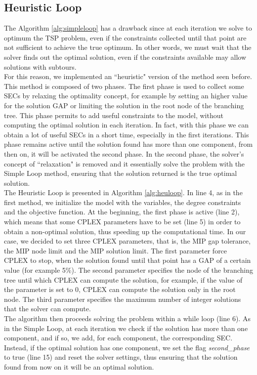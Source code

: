 \subsection{Heuristic Loop}
The Algorithm \ref{alg:simpleloop} has a drawback since at each iteration we solve to optimum the TSP problem, even if the constraints collected until that point are not sufficient to achieve the true optimum. In other words, we must wait that the solver finds out the optimal solution, even if the constraints available may allow solutions with subtours.
\\ For this reason, we implemented an ``heuristic" version of the method seen before. This method is composed of two phases. The first phase is used to collect some SECs by relaxing the optimality concept, for example by setting an higher value for the solution GAP or limiting the solution in the root node of the branching tree.
This phase permits to add useful constraints to the model, without computing the optimal solution in each iteration. In fact, with this phase we can obtain a lot of useful SECs in a short time, especially in the first iterations.
This phase remains active until the solution found has more than one component, from then on, it will be activated the second phase. 
In the second phase, the solver's concept of ``relaxation" is removed and it essentially solve the problem with the Simple Loop method, ensuring that the solution returned is the true optimal solution.
\\ The Heuristic Loop is presented in Algorithm \ref{alg:heuloop}. In line 4, as in the first method, we initialize the model with the variables, the degree constraints and the objective function.
At the beginning, the first phase is active (line 2), which means that some CPLEX parameters have to be set (line 5) in order to obtain a non-optimal solution, thus speeding up the computational time. In our case, we decided to set three CPLEX parameters, that is, the MIP gap tolerance, the MIP node limit and the MIP solution limit. The first parameter force CPLEX to stop, when the solution found until that point has a GAP of a certain value (for example 5\%). The second parameter specifies the node of the branching tree until which CPLEX can compute the solution, for example, if the value of the parameter is set to 0, CPLEX can compute the solution only in the root node. The third parameter specifies the maximum number of integer solutions that the solver can compute. \\
The algorithm then proceeds solving the problem within a while loop (line 6). As in the Simple Loop, at each iteration we check if the solution has more than one component, and if so, we add, for each component, the corresponding SEC. \\ Instead, if the optimal solution has one component, we set the flag \textit{second\_phase} to true (line 15) and reset the solver settings, thus ensuring that the solution found from now on it will be an optimal solution.
